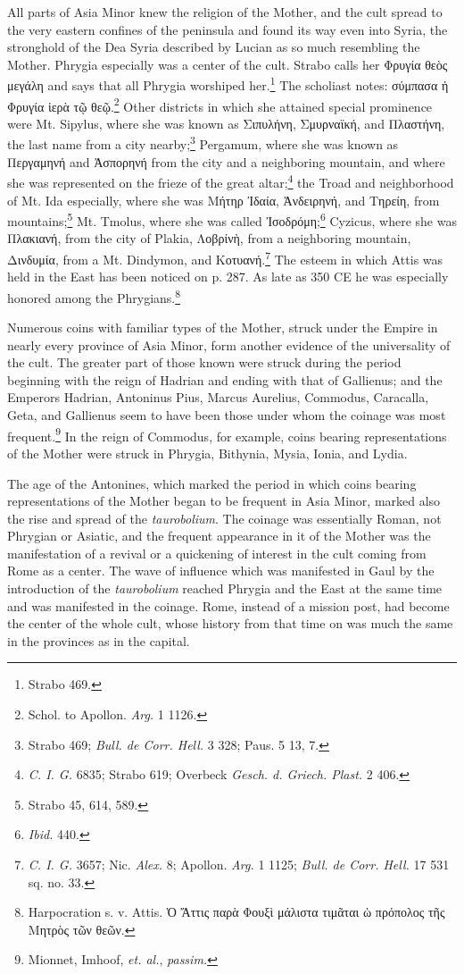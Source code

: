 \documentclass[a4paper, 11pt, oneside, polutonikogreek, english]{article}
\begin{document}
All parts of Asia Minor knew the religion of the Mother, and the cult spread to the very eastern confines of the peninsula and found its way even into Syria, the stronghold of the Dea Syria described by Lucian as so much resembling the Mother. Phrygia especially was a center of the cult. Strabo calls her Φρυγία θεὸς μεγάλη and says that all Phrygia worshiped her.\footnote{Strabo 469.} The scholiast notes: σύμπασα ἡ Φρυγία ἱερὰ τῷ θεῷ.\footnote{Schol. to Apollon. \emph{Arg.} 1 1126.} Other districts in which she attained special prominence were Mt. Sipylus, where she was known as Σιπυλήνη, Σμυρναϊκή, and Πλαστήνη, the last name from a city nearby;\footnote{Strabo 469; \emph{Bull. de Corr. Hell.} 3 328; Paus. 5 13, 7.} Pergamum, where she was known as Περγαμηνή and Ἀσπορηνή from the city and a neighboring mountain, and where she was represented on the frieze of the great altar;\footnote{\emph{C. I. G.} 6835; Strabo 619; Overbeck \emph{Gesch. d. Griech. Plast.} 2 406.} the Troad and neighborhood of Mt. Ida especially, where she was Μήτηρ Ἰδαία, Ἀνδειρηνή, and Τηρείη, from mountains;\footnote{Strabo 45, 614, 589.} Mt. Tmolus, where she was called Ἰσοδρόμη;\footnote{\emph{Ibid.} 440.} Cyzicus, where she was Πλακιανή, from the city of Plakia, Λοβρίνὴ, from a neighboring mountain, Δινδυμία, from a Mt. Dindymon, and Κοτυανή.\footnote{\emph{C. I. G.} 3657; Nic. \emph{Alex.} 8; Apollon. \emph{Arg.} 1 1125; \emph{Bull. de Corr. Hell.} 17 531 sq. no. 33.} The esteem in which Attis was held in the East has been noticed on p. 287. As late as 350 \textsc{CE} he was especially honored among the Phrygians.\footnote{Harpocration s. v. Attis. Ὁ Ἄττις παρὰ Φουξὶ μάλιστα τιμᾶται ὡ πρόπολος τῆς Μητρὸς τῶν θεῶν.}

Numerous coins with familiar types of the Mother, struck under the Empire in nearly every province of Asia Minor, form another evidence of the universality of the cult. The greater part of those known were struck during the period beginning with the reign of Hadrian and ending with that of Gallienus; and the Emperors Hadrian, Antoninus Pius, Marcus Aurelius, Commodus, Caracalla, Geta, and Gallienus seem to have been those under whom the coinage was most frequent.\footnote{Mionnet, Imhoof, \emph{et. al.}, \emph{passim.}} In the reign of Commodus, for example, coins bearing representations of the Mother were struck in Phrygia, Bithynia, Mysia, Ionia, and Lydia.

The age of the Antonines, which marked the period in which coins bearing representations of the Mother began to be frequent in Asia Minor, marked also the rise and spread of the \emph{taurobolium}. The coinage was essentially Roman, not Phrygian or Asiatic, and the frequent appearance in it of the Mother was the manifestation of a revival or a quickening of interest in the cult coming from Rome as a center. The wave of influence which was manifested in Gaul by the introduction of the \emph{taurobolium} reached Phrygia and the East at the same time and was manifested in the coinage. Rome, instead of a mission post, had become the center of the whole cult, whose history from that time on was much the same in the provinces as in the capital.
\end{document}
